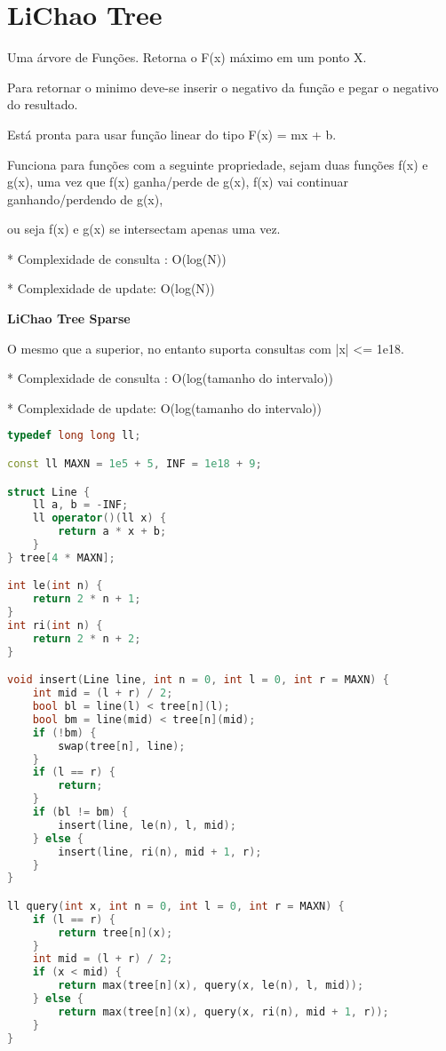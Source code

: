 \documentclass[11pt, a4paper, oneside]{book}
\begin{document}
\hfill

\section{LiChao Tree}


Uma árvore de Funções. Retorna o F(x) máximo em um ponto X.



Para retornar o minimo deve-se inserir o negativo da função e pegar o negativo do resultado.



Está pronta para usar função linear do tipo F(x) = mx + b.



Funciona para funções com a seguinte propriedade, sejam duas funções f(x) e g(x), uma vez que f(x) ganha/perde de g(x), f(x) vai continuar ganhando/perdendo de g(x),

ou seja f(x) e g(x) se intersectam apenas uma vez.



* Complexidade de consulta : O(log(N))

* Complexidade de update: O(log(N))



\textbf{LiChao Tree Sparse} 



O mesmo que a superior, no entanto suporta consultas com |x| <= 1e18.



* Complexidade de consulta : O(log(tamanho do intervalo))

* Complexidade de update: O(log(tamanho do intervalo))

\hfill

\begin{multicols}{2}
\begin{lstlisting}[language=C++]
typedef long long ll;

const ll MAXN = 1e5 + 5, INF = 1e18 + 9;

struct Line {
    ll a, b = -INF;
    ll operator()(ll x) {
        return a * x + b;
    }
} tree[4 * MAXN];

int le(int n) {
    return 2 * n + 1;
}
int ri(int n) {
    return 2 * n + 2;
}

void insert(Line line, int n = 0, int l = 0, int r = MAXN) {
    int mid = (l + r) / 2;
    bool bl = line(l) < tree[n](l);
    bool bm = line(mid) < tree[n](mid);
    if (!bm) {
        swap(tree[n], line);
    }
    if (l == r) {
        return;
    }
    if (bl != bm) {
        insert(line, le(n), l, mid);
    } else {
        insert(line, ri(n), mid + 1, r);
    }
}

ll query(int x, int n = 0, int l = 0, int r = MAXN) {
    if (l == r) {
        return tree[n](x);
    }
    int mid = (l + r) / 2;
    if (x < mid) {
        return max(tree[n](x), query(x, le(n), l, mid));
    } else {
        return max(tree[n](x), query(x, ri(n), mid + 1, r));
    }
}
\end{lstlisting}
\end{multicols}
\end{document}
